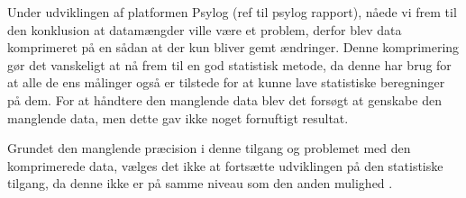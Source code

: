Under udviklingen af platformen Psylog (ref til psylog rapport), nåede vi frem til den konklusion at datamængder ville være et problem, derfor blev data komprimeret på en sådan at der kun bliver gemt ændringer.
Denne komprimering gør det vanskeligt at nå frem til en god statistisk metode, da denne har brug for at alle de ens målinger også er tilstede for at kunne lave statistiske beregninger på dem.
For at håndtere den manglende data blev det forsøgt at genskabe den manglende data, men dette gav ikke noget fornuftigt resultat.

Grundet den manglende præcision i denne tilgang og problemet med den komprimerede data, vælges det ikke at fortsætte udviklingen på den statistiske tilgang, da denne ikke er på samme niveau som den anden mulighed \citep{6563918}.